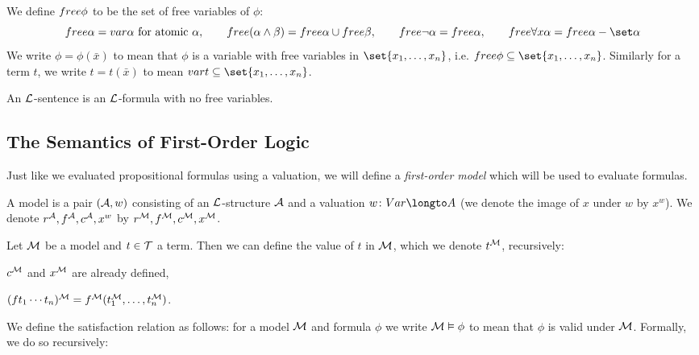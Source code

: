 We define ${\sl free}\phi$ to be the set of free variables of $\phi$:
$$ \free\alpha = \var\alpha\hbox{ for atomic $\alpha$},\qquad
\free(\alpha\land\beta)=\free\alpha\cup\free\beta,\qquad
\free\neg\alpha=\free\alpha,\qquad \free\forall x\alpha = \free\alpha-\set\alpha $$
We write $\phi=\phi(\bar x)$ to mean that $\phi$ is a variable with free variables in
$\set{x_1,\dots,x_n}$, i.e. $\free\phi\subseteq\set{x_1,\dots,x_n}$.
Similarly for a term $t$, we write $t=t(\bar x)$ to mean $\var t\subseteq\set{x_1,\dots,x_n}$.

\bdefn

    An {\emphcolor ${\cal L}$-sentence} is an ${\cal L}$-formula with no free variables.

\edefn

\subsection{The Semantics of First-Order Logic}

Just like we evaluated propositional formulas using a valuation, we will define a {\it first-order
model} which will be used to evaluate formulas.

\bdefn

    A {\emphcolor model} is a pair $({\cal A},w)$ consisting of an ${\cal L}$-structure ${\cal A}$
    and a valuation $w\colon \Var\longto A$ (we denote the image of $x$ under $w$ by $x^w$).
    We denote $r^{{\cal A}},f^{{\cal A}},c^{{\cal A}},x^w$ by $r^{{\cal M}},f^{{\cal M}},c^{{\cal M}},x^{{\cal M}}$.

\edefn

Let ${\cal M}$ be a model and $t\in{\cal T}$ a term.
Then we can define the value of $t$ in ${\cal M}$, which we denote $t^{{\cal M}}$, recursively:
\benum
    \item $c^{{\cal M}}$ and $x^{{\cal M}}$ are already defined,
    \item $(ft_1\cdots t_n)^{{\cal M}}=f^{{\cal M}}(t_1^{{\cal M}},\dots,t_n^{{\cal M}})$.
\eenum

We define the satisfaction relation as follows: for a model ${\cal M}$ and formula $\phi$
we write ${\cal M}\vDash\phi$ to mean that $\phi$ is valid under ${\cal M}$.
Formally, we do so recursively:

\centerline{\vbox{}}

